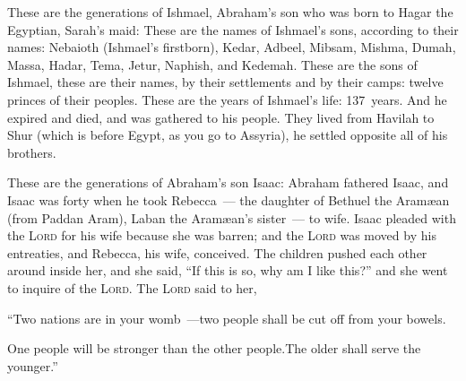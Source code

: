 \begin{inparaenum}
   These are the generations of Ishmael, Abraham's son who was born to Hagar the Egyptian, Sarah's maid:%
   These are the names of Ishmael's sons, according to their names: Nebaioth (Ishmael's firstborn), Kedar, Adbeel, Mibsam,%
   Mishma, Dumah, Massa,%
   Hadar, Tema, Jetur, Naphish, and Kedemah.%
   These are the sons of Ishmael, these are their names, by their settlements and by their camps: twelve princes of their peoples.%
   These are the years of Ishmael's life: 137~years. And he expired and died, and was gathered to his people.%
   They lived from Havilah to Shur (which is before Egypt, as you go to Assyria), he settled opposite all of his brothers.%
  
   These are the generations of Abraham's son Isaac: Abraham fathered Isaac,%
   and Isaac was forty when he took Rebecca~--- the daughter of Bethuel the Aram\ae an (from Paddan Aram), Laban the Aram\ae an's sister~--- to wife.%
   Isaac pleaded with the \textsc{Lord} for his wife because she was barren; and the \textsc{Lord} was moved by his entreaties, and Rebecca, his wife, conceived.%
   The children pushed each other around inside her, and she said, ``If this is so, why am I like this?'' and she went to inquire of the \textsc{Lord}.%
   The \textsc{Lord} said to her,\smallskip%
  
  \pd ``Two nations are in your womb~---\pa two people shall be cut off from your bowels.%
  
  \pd One people will be stronger than the other people.\pa The older shall serve the younger.''%
  

\end{inparaenum}
